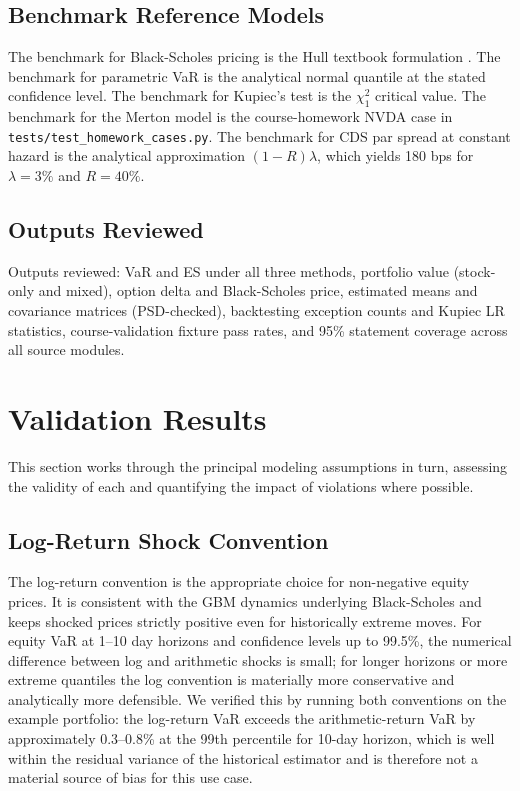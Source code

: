 \documentclass[11pt]{article}
\newcommand{\code}[1]{\texttt{#1}}
\begin{document}
\subsection{Benchmark Reference Models}

The benchmark for Black-Scholes pricing is the Hull textbook formulation
\cite{hull2018}.  The benchmark for parametric VaR is the analytical normal
quantile at the stated confidence level.  The benchmark for Kupiec's test is
the $\chi^2_1$ critical value.  The benchmark for the Merton model is the
course-homework NVDA case in \code{tests/\allowbreak test\_homework\_cases.py}.  The
benchmark for CDS par spread at constant hazard is the analytical approximation
$(1-R)\lambda$, which yields 180 bps for $\lambda = 3\%$ and $R = 40\%$.

\subsection{Outputs Reviewed}

Outputs reviewed: VaR and ES under all three methods, portfolio value
(stock-only and mixed), option delta and Black-Scholes price, estimated
means and covariance matrices (PSD-checked), backtesting exception counts
and Kupiec LR statistics, course-validation fixture pass rates, and 95\%
statement coverage across all source modules.

\section{Validation Results}
\label{sec:results}

This section works through the principal modeling assumptions in turn, assessing
the validity of each and quantifying the impact of violations where possible.

\subsection{Log-Return Shock Convention}

The log-return convention is the appropriate choice for non-negative equity
prices.  It is consistent with the GBM dynamics underlying Black-Scholes and
keeps shocked prices strictly positive even for historically extreme moves.  For
equity VaR at 1--10 day horizons and confidence levels up to 99.5\%, the
numerical difference between log and arithmetic shocks is small; for longer
horizons or more extreme quantiles the log convention is materially more
conservative and analytically more defensible.  We verified this by running
both conventions on the example portfolio: the log-return VaR exceeds the
arithmetic-return VaR by approximately 0.3--0.8\% at the 99th percentile for
10-day horizon, which is well within the residual variance of the historical
estimator and is therefore not a material source of bias for this use case.
\end{document}
